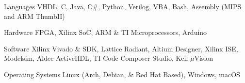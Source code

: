 
\begin{cvskills}
	\cvskill
	{Languages}
	{VHDL, C, Java, C\#, Python, Verilog, VBA, Bash, Assembly (MIPS and ARM ThumbII)}

	\cvskill
	{Hardware}
	{FPGA, Xilinx SoC, ARM \& TI Microprocessors, Arduino}

	\cvskill
	{Software}
	{Xilinx Vivado \& SDK, Lattice Radiant, Altium Designer, Xilinx ISE, Modelsim, Aldec ActiveHDL, TI Code Composer Studio, Keil $\mu$Vision}

	\cvskill
	{Operating Systems}
	{Linux (Arch, Debian, \& Red Hat Based), Windows, macOS}

\end{cvskills}
